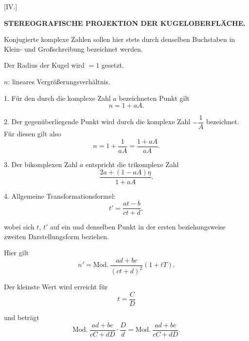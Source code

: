 
\begin{center}
[IV.]
\end{center}

\begin{center}
\bfseries STEREOGRAFISCHE PROJEKTION DER KUGELOBERFLÄCHE.
\end{center}

Konjugierte komplexe Zahlen sollen hier stets durch denselben Buchstaben in Klein- und Großschreibung bezeichnet werden.

Der Radius der Kugel wird $=1$ gesetzt.

$n$: lineares Vergrößerungsverhältnis.

1. Für den durch die komplexe Zahl $a$ bezeichneten Punkt gilt
\[
n = 1+aA.
\]

2. Der gegenüberliegende Punkt wird durch die komplexe Zahl $-\dfrac{1}{A}$ bezeichnet. Für diesen gilt also
\[
n = 1+\frac{1}{aA} = \frac{1+aA}{aA}.
\]

3. Der bikomplexen Zahl $a$ entspricht die trikomplexe Zahl
\[
\frac{2a+(1-aA)\eta}{1+aA}.
\]

4. Allgemeine Transformationsformel:
\[
t' = \frac{at-b}{ct+d},
\]

wobei sich $t$, $t'$ auf ein und denselben Punkt in der ersten beziehungsweise zweiten Darstellungsform beziehen.

Hier gilt
\[
n' = \text{Mod.}\ \frac{ad+bc}{(ct+d)^2}(1+tT).
\]

Der kleinste Wert wird erreicht für
\[
t = \frac{C}{D}
\]

\noindent und beträgt
\[
\text{Mod.}\ \frac{ad+bc}{cC+dD}\cdot\frac{D}{d} = \text{Mod.}\ \frac{ad+bc}{cC+dD}.
\]

